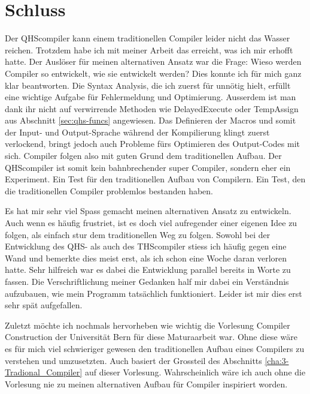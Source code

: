 \chapter{Schluss}
Der QHScompiler kann einem traditionellen Compiler leider nicht das Wasser reichen.
Trotzdem habe ich mit meiner Arbeit das erreicht, was ich mir erhofft hatte. Der Auslöser für meinen alternativen Ansatz war die Frage: Wieso werden Compiler so entwickelt, wie sie entwickelt werden? 
Dies konnte ich für mich ganz klar beantworten. Die Syntax Analysis, die ich zuerst für unnötig hielt, erfüllt eine wichtige Aufgabe für Fehlermeldung und Optimierung.
Ausserdem ist man dank ihr nicht auf verwirrende Methoden wie DelayedExecute oder TempAssign aus Abschnitt \ref{sec:qhs-funcs} angewiesen.
Das Definieren der Macros und somit der Input- und Output-Sprache während der Kompilierung klingt zuerst verlockend, bringt jedoch auch Probleme fürs Optimieren des Output-Codes mit sich.
Compiler folgen also mit guten Grund dem traditionellen Aufbau.
Der QHScompiler ist somit kein bahnbrechender super Compiler, sondern eher ein Experiment.
Ein Test für den traditionellen Aufbau von Compilern. Ein Test, den die traditionellen Compiler problemlos bestanden haben.

Es hat mir sehr viel Spass gemacht meinen alternativen Ansatz zu entwickeln. Auch wenn es häufig frustriet, ist es doch viel aufregender einer eigenen Idee zu folgen, als einfach stur dem traditionellen Weg zu folgen.
Sowohl bei der Entwicklung des QHS- als auch des THScompiler stiess ich häufig gegen eine Wand und bemerkte dies meist erst, als ich schon eine Woche daran verloren hatte.
Sehr hilfreich war es dabei die Entwicklung parallel bereits in Worte zu fassen. Die Verschriftlichung meiner Gedanken half mir dabei ein Verständnis aufzubauen, wie mein Programm tatsächlich funktioniert.
Leider ist mir dies erst sehr spät aufgefallen.

Zuletzt möchte ich nochmals hervorheben wie wichtig die Vorlesung Compiler Construction der Universität Bern für diese Maturaarbeit war.
Ohne diese wäre es für mich viel schwieriger gewesen den traditionellen Aufbau eines Compilers zu verstehen und umzusetzten.
Auch basiert der Grossteil des Abschnitts \ref{cha:3-Tradional_Compiler} auf dieser Vorlesung.
Wahrscheinlich wäre ich auch ohne die Vorlesung nie zu meinen alternativen Aufbau für Compiler inspiriert worden.
